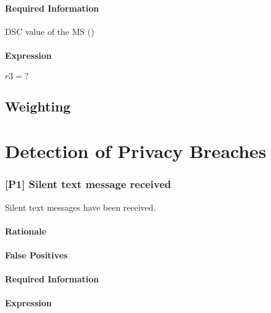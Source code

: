 \documentclass[a4paper,11pt,notitlepage,bigheadings,oneside]{scrartcl}
\begin{document}

\paragraph{Required Information}

DSC value of the MS ()

\paragraph{Expression}

$r3 = ?$

\subsection{Weighting}

\section{Detection of Privacy Breaches}
\label{sec:detection_of_privacy_breaches}

\subsubsection{[P1] Silent text message received}

Silent text messages have been received.

\paragraph{Rationale}

\TBD{}

\paragraph{False Positives}


\paragraph{Required Information}

\TBD{}

\paragraph{Expression}
\end{document}
